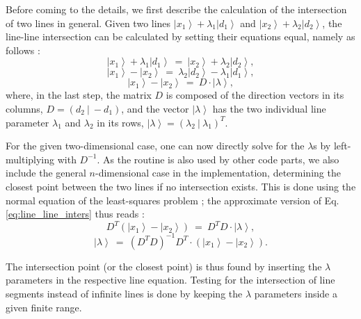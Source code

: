 Before coming to the details, we first describe the calculation of the intersection of two lines in general.
Given two lines $\left|x_1\right> + \lambda_1 \left|d_1\right>$ and $\left|x_2\right> + \lambda_2 \left|d_2\right>$, 
the line-line intersection can be calculated by setting their equations equal, namely as follows \cite{wiki_line_line_intersection}:
\begin{equation}
	\left|x_1\right> + \lambda_1 \left|d_1\right> \ =\ \left|x_2\right> + \lambda_2 \left|d_2\right>,
\end{equation}
\begin{equation}
	\left|x_1\right> - \left|x_2\right> \ =\  \lambda_2 \left|d_2\right> - \lambda_1 \left|d_1\right>,
\end{equation}
\begin{equation}
	\left|x_1\right> - \left|x_2\right> \ =\  D \cdot \left| \lambda \right>,
	\label{eq:line_line_inters}
\end{equation}
where, in the last step, the matrix $D$ is composed of the direction vectors in its columns, $D = \left( d_2 \ |\  -d_1 \right)$, 
and the vector $\left| \lambda \right>$ has the two individual line parameter $\lambda_1$ and $\lambda_2$ in its
rows, $\left| \lambda \right> = \left( \lambda_2 \ |\  \lambda_1 \right)^T$.

For the given two-dimensional case, one can now directly solve for the $\lambda$s by left-multiplying with $D^{-1}$.
As the routine is also used by other code parts, we also include the general $n$-dimensional case in the implementation, 
determining the closest point between the two lines if no intersection exists.
This is done using the normal equation of the least-squares problem \cite[p. 793]{Arens2015}; 
the approximate version of Eq. \ref{eq:line_line_inters} thus reads \cite{wiki_line_line_intersection}: 
\begin{equation}
	D^T \left(\left|x_1\right> - \left|x_2\right>\right) \ =\  D^T D \cdot \left| \lambda \right>,
\end{equation}
\begin{equation}
	\left| \lambda \right> \ =\  \left( D^T D \right)^{-1} D^T \cdot \left( \left|x_1\right> - \left|x_2\right> \right).
\end{equation}

The intersection point (or the closest point) is thus found by inserting the $\lambda$ parameters in the respective line equation. 
Testing for the intersection of line segments instead of infinite lines is done by keeping the $\lambda$ parameters inside a given 
finite range.

